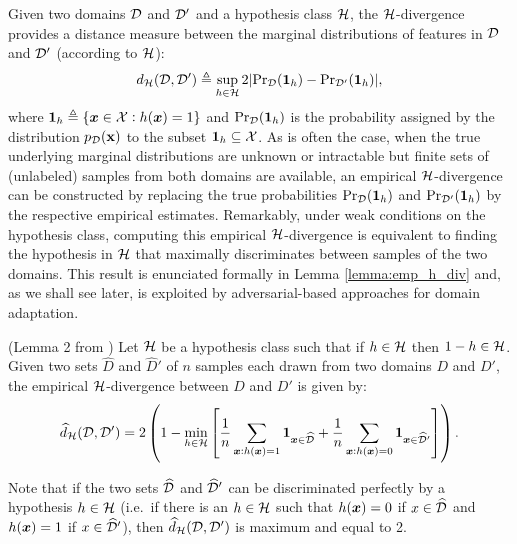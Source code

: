 Given two domains ${\mathcal{D}}$ and ${\mathcal{D}}'$ and a hypothesis class ${\mathcal{H}}$, the ${\mathcal{H}}$-divergence provides a distance measure between the marginal distributions of features in ${\mathcal{D}}$ and ${\mathcal{D}}'$ (according to ${\mathcal{H}}$):
\begin{equation*}
	\label{eq:h_div}
	d_{{\mathcal{H}}}({\mathcal{D}},{\mathcal{D}}') \triangleq \sup_{h \in {\mathcal{H}}} 2 |\mathrm{Pr}_{{\mathcal{D}}}(\bm{1}_h) - \mathrm{Pr}_{{\mathcal{D}}'}(\bm{1}_h)|,
\end{equation*}
where $\bm{1}_h \triangleq \{{\bm{x}} \in {\mathcal{X}}: h({\bm{x}})=1\}$ and $\mathrm{Pr}_{{\mathcal{D}}}(\bm{1}_h)$ is the probability assigned by the distribution $p_{\mathcal{D}}({\mathbf{x}})$ to the subset $\bm{1}_h \subseteq {\mathcal{X}}$. As is often the case, when the true underlying marginal distributions are unknown or intractable but finite sets of (unlabeled) samples from both domains are available, an empirical ${\mathcal{H}}$-divergence can be constructed by replacing the true probabilities $\mathrm{Pr}_{{\mathcal{D}}}(\bm{1}_h)$ and $\mathrm{Pr}_{{\mathcal{D}}'}(\bm{1}_h)$ by the respective empirical estimates. Remarkably, under weak conditions on the hypothesis class, computing this empirical ${\mathcal{H}}$-divergence is equivalent to finding the hypothesis in ${\mathcal{H}}$ that maximally discriminates between samples of the two domains. This result is enunciated formally in Lemma \ref{lemma:emp_h_div} and, as we shall see later, is exploited by adversarial-based approaches for domain adaptation.
\begin{lemma}
	\label{lemma:emp_h_div}
	(Lemma 2 from \citet{BenDavid2010}) Let ${\mathcal{H}}$ be a hypothesis class such that if $h \in {\mathcal{H}}$ then $1-h \in {\mathcal{H}}$. Given two sets $\widehat{D}$ and $\widehat{D}'$ of $n$ samples each drawn from two domains $D$ and $D'$, the empirical ${\mathcal{H}}$-divergence between $D$ and $D'$ is given by:
	\begin{equation}
		\widehat{d}_{{\mathcal{H}}}({\mathcal{D}},{\mathcal{D}}') = 2 \left(1 - \min_{h \in {\mathcal{H}}} \left[\frac{1}{n} \sum_{{\bm{x}}: h({\bm{x}})=1} \bm{1}_{{\bm{x}} \in \widehat{{\mathcal{D}}}} + \frac{1}{n} \sum_{{\bm{x}}: h({\bm{x}})=0} \bm{1}_{{\bm{x}} \in \widehat{{\mathcal{D}}}'}\right]\right).
	\end{equation}
\end{lemma}
Note that if the two sets $\widehat{{\mathcal{D}}}$ and $\widehat{{\mathcal{D}}}'$ can be discriminated perfectly by a hypothesis $h \in {\mathcal{H}}$ (i.e.\ if there is an $h \in {\mathcal{H}}$ such that $h({\bm{x}}) = 0$ if $x \in \widehat{{\mathcal{D}}}$ and $h({\bm{x}}) = 1$ if $x \in \widehat{{\mathcal{D}}}'$), then $\widehat{d}_{{\mathcal{H}}}({\mathcal{D}},{\mathcal{D}}')$ is maximum and equal to 2.

